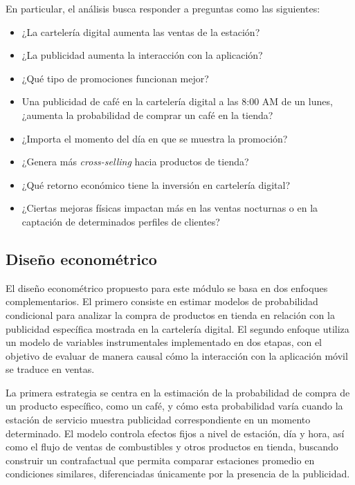 En particular, el análisis busca responder a preguntas como las siguientes: 

\begin{itemize}
    \item ¿La cartelería digital aumenta las ventas de la estación?
    \item ¿La publicidad aumenta la interacción con la aplicación?
    \item ¿Qué tipo de promociones funcionan mejor?
    \item Una publicidad de café en la cartelería digital a las 8:00 AM de un lunes, ¿aumenta la probabilidad de comprar un café en la tienda?
    \item ¿Importa el momento del día en que se muestra la promoción?
    \item ¿Genera más \emph{cross-selling} hacia productos de tienda?
    \item ¿Qué retorno económico tiene la inversión en cartelería digital?
    \item ¿Ciertas mejoras físicas impactan más en las ventas nocturnas o en la captación de determinados perfiles de clientes?
\end{itemize}




\subsection{Diseño econométrico}

El diseño econométrico propuesto para este módulo se basa en dos enfoques complementarios. El primero consiste en estimar modelos de probabilidad condicional para analizar la compra de productos en tienda en relación con la publicidad específica mostrada en la cartelería digital. El segundo enfoque utiliza un modelo de variables instrumentales implementado en dos etapas, con el objetivo de evaluar de manera causal cómo la interacción con la aplicación móvil se traduce en ventas.

La primera estrategia se centra en la estimación de la probabilidad de compra de un producto específico, como un café, y cómo esta probabilidad varía cuando la estación de servicio muestra publicidad correspondiente en un momento determinado. El modelo controla efectos fijos a nivel de estación, día y hora, así como el flujo de ventas de combustibles y otros productos en tienda, buscando construir un contrafactual que permita comparar estaciones promedio en condiciones similares, diferenciadas únicamente por la presencia de la publicidad.


